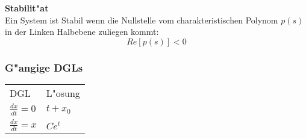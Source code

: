 		\textbf{Stabilit"at}\\
			Ein System ist Stabil wenn die Nullstelle vom charakteristischen Polynom
			$p(s)$ in der Linken Halbebene zuliegen kommt:\\
			$$Re[p(s)] < 0$$
			
	\subsubsection{G"angige DGLs}
	  \label{sec:dgls}
	  \begin{tabular}{ll}
	    DGL & L"osung\\
	    $\frac{dx}{dt} = 0$
	    & $t + x_0$\\
	    $\frac{dx}{dt} = x$
	    & $C e^{t}$\\
	  \end{tabular}
	